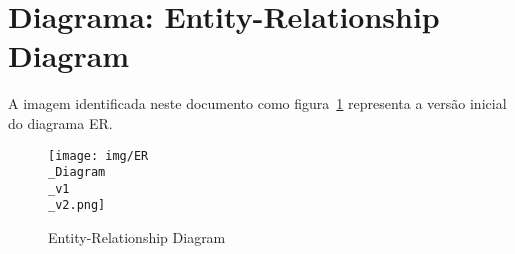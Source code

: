 
\section{Diagrama: Entity-Relationship Diagram}
A imagem identificada neste documento como figura~\ref{fig:erd3170} representa a versão inicial do diagrama ER.

\begin{figure}[htb]
	\centering
	\texttt{[image: img/ER\\\_Diagram\\\_v1\\\_v2.png]}  %
	\caption{Entity-Relationship Diagram}
	\label{fig:erd3170}
\end{figure}


